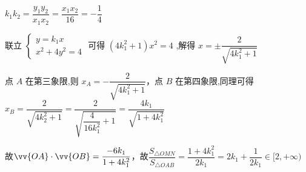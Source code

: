 \begin{enumerate}
\begin{jieda}
\begin{enumerate}
            $k_1k_2 = \dfrac{y_1y_2}{x_1x_2} = \dfrac{x_1x_2}{16} = -\dfrac{1}{4}$
            
            
            联立 $\left\{  \begin{array}{l} y = {k}_{1}x \\  {x}^{2} + 4{y}^{2} = 4 \end{array}\right.$ 可得 $\left( {4{k}_{1}^{2} + 1}\right) {x}^{2} = 4$ ,解得 $x =  \pm  \dfrac{2}{\sqrt{4{k}_{1}^{2} + 1}}$ 
            
            点 $A$ 在第三象限,则 ${x}_{A} =  - \dfrac{2}{\sqrt{4{k}_{1}^{2} + 1}}$，点 $B$ 在第四象限,同理可得 ${x}_{B} = \dfrac{2}{\sqrt{4{k}_{2}^{2} + 1}} = \dfrac{2}{\sqrt{\dfrac{4}{16k_1^2}+1}} = \dfrac{4k_1}{\sqrt{1+4k_1^2}}$ 

            故$\vv{OA} \cdot \vv{OB} = \dfrac{-6k_1}{1+4k_1^2}$，故$\dfrac{{S}_{\bigtriangleup {OMN}}}{{S}_{\bigtriangleup {OAB}}} = \dfrac{1+4k_1^2}{2k_1} = 2k_1+\dfrac{1}{2k_1} \in [2,+\infty)$
            
        \end{enumerate}
    \end{jieda}
\end{enumerate}
